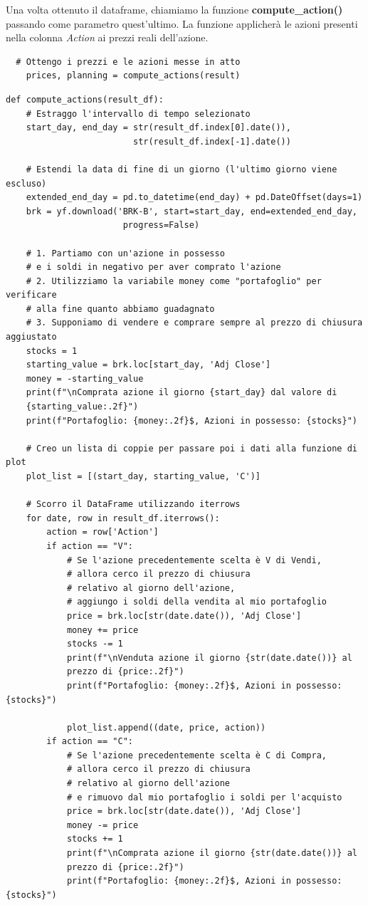 \documentclass{article}
\begin{document}
Una volta ottenuto il dataframe, chiamiamo la funzione \textbf{compute\_action()} passando come parametro quest'ultimo. La funzione applicherà le azioni presenti nella colonna \textit{Action} ai prezzi reali dell'azione.
\begin{verbatim}
  # Ottengo i prezzi e le azioni messe in atto
    prices, planning = compute_actions(result)
\end{verbatim}
\begin{verbatim}
def compute_actions(result_df):
    # Estraggo l'intervallo di tempo selezionato
    start_day, end_day = str(result_df.index[0].date()), 
                         str(result_df.index[-1].date())
                         
    # Estendi la data di fine di un giorno (l'ultimo giorno viene escluso)
    extended_end_day = pd.to_datetime(end_day) + pd.DateOffset(days=1)
    brk = yf.download('BRK-B', start=start_day, end=extended_end_day,
                       progress=False)

    # 1. Partiamo con un'azione in possesso
    # e i soldi in negativo per aver comprato l'azione
    # 2. Utilizziamo la variabile money come "portafoglio" per verificare 
    # alla fine quanto abbiamo guadagnato
    # 3. Supponiamo di vendere e comprare sempre al prezzo di chiusura aggiustato
    stocks = 1
    starting_value = brk.loc[start_day, 'Adj Close']
    money = -starting_value
    print(f"\nComprata azione il giorno {start_day} dal valore di 
    {starting_value:.2f}")
    print(f"Portafoglio: {money:.2f}$, Azioni in possesso: {stocks}")

    # Creo un lista di coppie per passare poi i dati alla funzione di plot
    plot_list = [(start_day, starting_value, 'C')]

    # Scorro il DataFrame utilizzando iterrows
    for date, row in result_df.iterrows():
        action = row['Action']
        if action == "V":
            # Se l'azione precedentemente scelta è V di Vendi, 
            # allora cerco il prezzo di chiusura
            # relativo al giorno dell'azione,
            # aggiungo i soldi della vendita al mio portafoglio
            price = brk.loc[str(date.date()), 'Adj Close']
            money += price
            stocks -= 1
            print(f"\nVenduta azione il giorno {str(date.date())} al 
            prezzo di {price:.2f}")
            print(f"Portafoglio: {money:.2f}$, Azioni in possesso: {stocks}")

            plot_list.append((date, price, action))
        if action == "C":
            # Se l'azione precedentemente scelta è C di Compra,
            # allora cerco il prezzo di chiusura
            # relativo al giorno dell'azione
            # e rimuovo dal mio portafoglio i soldi per l'acquisto
            price = brk.loc[str(date.date()), 'Adj Close']
            money -= price
            stocks += 1
            print(f"\nComprata azione il giorno {str(date.date())} al 
            prezzo di {price:.2f}")
            print(f"Portafoglio: {money:.2f}$, Azioni in possesso: {stocks}")


\end{verbatim}
\end{document}
